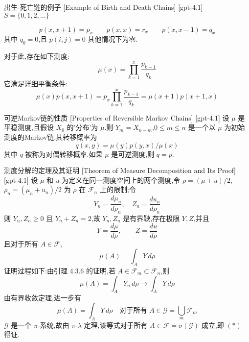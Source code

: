 \documentclass[UTF8]{ctexart}
\begin{document}
    
    
    \begin{xmp}
        {出生-死亡链的例子}
        [Example of Birth and Death Chains]
        [gpt-4.1]
        $S = \{ 0 , 1 , 2 , \ldots \}$

\[
p ( x , x + 1 ) = p _ { x } \qquad p ( x , x ) = r _ { x } \qquad p ( x , x - 1 ) = q _ { x }
\]
其中 $q _ { 0 } = 0$,且 $p ( i , j ) = 0$ 其他情况下为零.

对于此,存在如下测度:
\[
\mu ( x ) = \prod _ { k = 1 } ^ { x } { \frac { p _ { k - 1 } } { q _ { k } } }
\]
它满足详细平衡条件:
\[
\mu ( x ) p ( x , x + 1 ) = p _ { x } \prod _ { k = 1 } ^ { x } { \frac { p _ { k - 1 } } { q _ { k } } } = \mu ( x + 1 ) p ( x + 1 , x )
\]

    \end{xmp}
    
    
    
    \begin{thm}
        {可逆Markov链的性质}
        [Properties of Reversible Markov Chains]
        [gpt-4.1]
        设 $\mu$ 是平稳测度,且假设 $X _ { 0 }$ 的'分布'为 $\mu$.则 $Y _ { m } = X _ { n - m }$,$0 \leq m \leq n$ 是一个以 $\mu$ 为初始测度的Markov链,其转移概率为
\[
q ( x , y ) = \mu ( y ) p ( y , x ) / \mu ( x )
\]
其中 $q$ 被称为对偶转移概率.如果 $\mu$ 是可逆测度,则 $q = p$.

    \end{thm}
    
    
    
    \begin{thm}
        {测度分解的定理及其证明}
        [Theorem of Measure Decomposition and Its Proof]
        [gpt-4.1]
        设 $\mu$ 和 $
u$ 为定义在同一测度空间上的两个测度,令 $\rho = (\mu+
u)/2$,$\rho_n = (\mu_n+
u_n)/2$ 为 $\rho$ 在 ${\mathcal{F}}_n$ 上的限制;令
\[
Y_n = \frac{d\mu_n}{d\rho_n}, \quad Z_n = \frac{d
u_n}{d\rho_n}
\]
则 $Y_n, Z_n \geq 0$ 且 $Y_n + Z_n = 2$,故 $Y_n, Z_n$ 是有界鞅,存在极限 $Y, Z$,并且
\[
Y = \frac{d\mu}{d\rho}, \qquad Z = \frac{d
u}{d\rho}
\]
且对于所有 $A \in {\mathcal{F}}$,
\[
\mu(A) = \int_A Y\, d\rho
\]
证明过程如下:由引理 4.3.6 的证明,若 $A \in {\mathcal{F}}_m \subset {\mathcal{F}}_n$,则
\[
\mu(A) = \int_A Y_n\, d\rho \to \int_A Y\, d\rho
\]
由有界收敛定理,进一步有
\[
\mu(A) = \int_A Y\, d\rho \quad \text{对于所有 } A \in {\mathcal{G}} = \bigcup_{m} {\mathcal{F}}_{m}
\]
$\mathcal{G}$ 是一个 $\pi$-系统,故由 $\pi$-$\lambda$ 定理,该等式对于所有 $A \in {\mathcal{F}} = \sigma(\mathcal{G})$ 成立,即 $(*)$ 得证.

    \end{thm}
    
\end{document}
